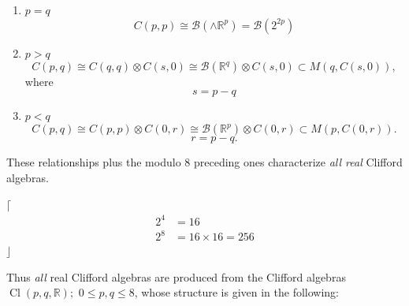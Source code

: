 \documentclass[aps,preprint]{revtex4}%
\begin{document}
\begin{enumerate}
\item $p=q$%
\begin{equation}
C\left(  p,p\right)  \cong\mathcal{B}\left(  \mathbb{\wedge R}^{p}\right)
=\mathcal{B}\left(  2^{2p}\right)
\end{equation}


\item $p>q$%
\begin{equation}
C\left(  p,q\right)  \cong C\left(  q,q\right)  \otimes C\left(  s,0\right)
\cong\mathcal{B}\left(  \mathbb{R}^{q}\right)  \otimes C\left(  s,0\right)
\subset M\left(  q,C\left(  s,0\right)  \right)  ,
\end{equation}
where
\begin{equation}
s=p-q
\end{equation}


\item $p<q$%
\begin{equation}
C\left(  p,q\right)  \cong C\left(  p,p\right)  \otimes C\left(  0,r\right)
\cong\mathcal{B}\left(  \mathbb{R}^{p}\right)  \otimes C\left(  0,r\right)
\subset M\left(  p,C\left(  0,r\right)  \right)  .
\end{equation}%
\begin{equation}
r=p-q.
\end{equation}

\end{enumerate}

These relationships plus the modulo $8$ preceding ones characterize\emph{ all
real }Clifford algebras.

$\lceil$%
\begin{align}
2^{4}  &  =16\\
2^{8}  &  =16\times16=256
\end{align}
$\rfloor$

Thus \emph{all }real Clifford algebras are produced from the Clifford algebras
$\operatorname*{Cl}\left(  p,q,\mathbb{R}\right)  ;$ $0\leq p,q\leq8$, whose
structure is given in the following:%
\end{document}
